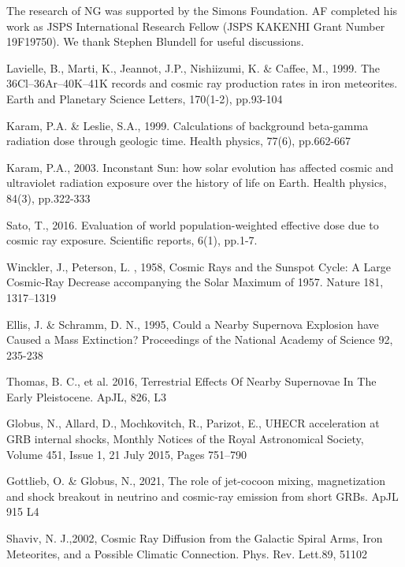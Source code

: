 \documentclass[a4paper,11pt]{article}
\begin{document}
\bigskip
The research of NG was supported by the Simons Foundation. AF completed his
work as JSPS International Research Fellow (JSPS KAKENHI Grant Number 19F19750). We thank Stephen Blundell for useful discussions. 

\footnotesize
\begin{thebibliography}{99}

 Lavielle, B., Marti, K., Jeannot, J.P., Nishiizumi, K. \& Caffee, M., 1999. The 36Cl–36Ar–40K–41K records and cosmic ray production rates in iron meteorites. Earth and Planetary Science Letters, 170(1-2), pp.93-104

Karam, P.A. \& Leslie, S.A., 1999. Calculations of background beta-gamma radiation dose through geologic time. Health physics, 77(6), pp.662-667


Karam, P.A., 2003. Inconstant Sun: how solar evolution has affected cosmic and ultraviolet radiation exposure over the history of life on Earth. Health physics, 84(3), pp.322-333

 Sato, T., 2016. Evaluation of world population-weighted effective dose due to cosmic ray exposure. Scientific reports, 6(1), pp.1-7.

 Winckler, J., Peterson, L. , 1958, Cosmic Rays and the Sunspot Cycle: A Large Cosmic-Ray Decrease accompanying the Solar Maximum of 1957. Nature 181, 1317–1319 


 Ellis, J. \& Schramm, D. N., 1995, Could a Nearby Supernova Explosion have Caused a Mass Extinction? Proceedings of the National Academy of Science 92, 235-238


Thomas, B. C., et al. 2016, Terrestrial Effects Of Nearby Supernovae In The Early Pleistocene. ApJL, 826, L3


Globus, N., Allard, D., Mochkovitch, R., Parizot, E., UHECR acceleration at GRB internal shocks, Monthly Notices of the Royal Astronomical Society, Volume 451, Issue 1, 21 July 2015, Pages 751–790



 Gottlieb, O. \&  Globus, N., 2021, The role of jet-cocoon mixing, magnetization and shock breakout in neutrino and cosmic-ray emission from short GRBs. ApJL 915 L4


 Shaviv, N.  J.,2002, Cosmic Ray Diffusion from the Galactic Spiral Arms, Iron Meteorites, and a Possible Climatic Connection. Phys. Rev. Lett.89, 51102



\end{thebibliography}
\end{document}
